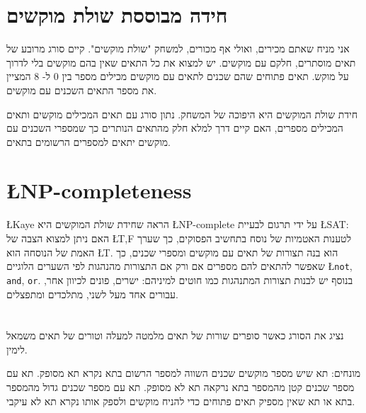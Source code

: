 \documentclass[12pt,a4paper]{article}
\begin{document}
\section{%
חידה מבוססת שולת מוקשים%
}
אני מניח שאתם מכירים, ואולי אף מכורים, למשחק "שולת מוקשים". קיים סורג מרובע של תאים מוסתרים, חלקם עם מוקשים. יש למצוא את כל התאים שאין בהם מוקשים בלי לדרוך על מוקש. תאים פתוחים שהם שכנים לתאים עם מוקשים מכילים מספר בין 
$0$
ל-%
$8$
המציין את מספר התאים השכנים עם מוקשים.

חידת שולת המוקשים היא היפוכה של המשחק. נתון סורג עם תאים המכילים מוקשים ותאים המכילים מספרים, האם קיים דרך למלא חלק מהתאים הנותרים כך שמספרי השכנים עם מוקשים יתאים למספרים הרשומים בתאים.

\section{\L{NP-completeness}}

\L{Kaye}
הראה שחידת שולת המוקשים היא
\L{NP-complete}
על ידי תרגום לבעיית
\L{SAT}:
האם ניתן למצוא הצבה של
\L{T,F}
%
לטענות האטמיות של נוסח בתחשיב הפסוקים, כך שערך האמת של הנוסחה הוא
\L{T}.
הוא בנה תצורות של תאים עם מוקשים ומספרי שכנים, כך שאפשר להתאים להם מספרים אם ורק אם התצורות מהנהגות לפי השערים הלוגיים
\L{\texttt{not}, \texttt{and}, \texttt{or}}.
בנוסף יש לבנות תצורות המתנהגות כמו חוטים למיניהם: ישרים, פונים לכיוון אחר, עבורים אחד מעל לשני, מתלכדים ומתפצלים. 

\section{}

נציג את הסורג כאשר סופרים שורות של תאים מלמטה למעלה וטורים של תאים משמאל לימין.

מונחים: תא שיש מספר מוקשים שכנים השווה למספר הרשום בתא נקרא תא מסופק. תא עם מספר שכנים קטן מהמספר בתא נרקאה תא לא מסופק. תא עם מספר שכנים גדול מהמספר בתא או תא שאין מספיק תאים פתוחים כדי להניח מוקשים ולספק אותו נקרא תא לא עיקבי.
\end{document}
